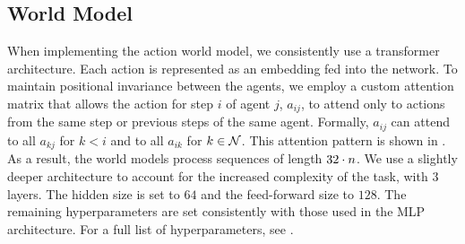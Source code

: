 \subsection{World Model}
When implementing the action world model, we consistently use a transformer architecture. Each action is represented as an embedding fed into the network. To maintain positional invariance between the agents, we employ a custom attention matrix that allows the action for step $i$ of agent $j$, $a_{ij}$, to attend only to actions from the same step or previous steps of the same agent. Formally, $a_{ij}$ can attend to all $a_{kj}$ for $k<i$ and to all $a_{ik}$ for $k \in \mathcal{N}$. This attention pattern is shown in . As a result, the world models process sequences of length $32 \cdot n$. We use a slightly deeper architecture to account for the increased complexity of the task, with $3$ layers. The hidden size is set to $64$ and the feed-forward size to $128$. The remaining hyperparameters are set consistently with those used in the MLP architecture. For a full list of hyperparameters, see .

